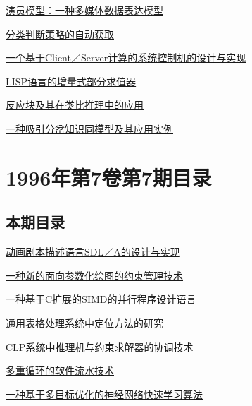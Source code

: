 \documentclass[a4paper]{article}
\begin{document}
\href{http://www.jos.org.cn/ch/reader/download_pdf.aspx?file_no=19960804&year_id=1996&quarter_id=8&falg=1}{演员模型：一种多媒体数据表达模型}

\href{http://www.jos.org.cn/ch/reader/download_pdf.aspx?file_no=19960805&year_id=1996&quarter_id=8&falg=1}{分类判断策略的自动获取}

\href{http://www.jos.org.cn/ch/reader/download_pdf.aspx?file_no=19960806&year_id=1996&quarter_id=8&falg=1}{一个基于Client／Server计算的系统控制机的设计与实现}

\href{http://www.jos.org.cn/ch/reader/download_pdf.aspx?file_no=19960807&year_id=1996&quarter_id=8&falg=1}{LISP语言的增量式部分求值器}

\href{http://www.jos.org.cn/ch/reader/download_pdf.aspx?file_no=19960808&year_id=1996&quarter_id=8&falg=1}{反应块及其在类比推理中的应用}

\href{http://www.jos.org.cn/ch/reader/download_pdf.aspx?file_no=19960809&year_id=1996&quarter_id=8&falg=1}{一种吸引分岔知识同模型及其应用实例}


\section{\textbf{1996年第7卷第7期目录}}
\subsection{本期目录}
\href{http://www.jos.org.cn/ch/reader/download_pdf.aspx?file_no=19960701&year_id=1996&quarter_id=7&falg=1}{动画剧本描述语言SDL／A的设计与实现}

\href{http://www.jos.org.cn/ch/reader/download_pdf.aspx?file_no=19960702&year_id=1996&quarter_id=7&falg=1}{一种新的面向参数化绘图的约束管理技术}

\href{http://www.jos.org.cn/ch/reader/download_pdf.aspx?file_no=19960703&year_id=1996&quarter_id=7&falg=1}{一种基于C扩展的SIMD的并行程序设计语言}

\href{http://www.jos.org.cn/ch/reader/download_pdf.aspx?file_no=19960704&year_id=1996&quarter_id=7&falg=1}{通用表格处理系统中定位方法的研究}

\href{http://www.jos.org.cn/ch/reader/download_pdf.aspx?file_no=19960705&year_id=1996&quarter_id=7&falg=1}{CLP系统中推理机与约束求解器的协调技术}

\href{http://www.jos.org.cn/ch/reader/download_pdf.aspx?file_no=19960706&year_id=1996&quarter_id=7&falg=1}{多重循环的软件流水技术}

\href{http://www.jos.org.cn/ch/reader/download_pdf.aspx?file_no=19960707&year_id=1996&quarter_id=7&falg=1}{一种基于多目标优化的神经网络快速学习算法}
\end{document}
